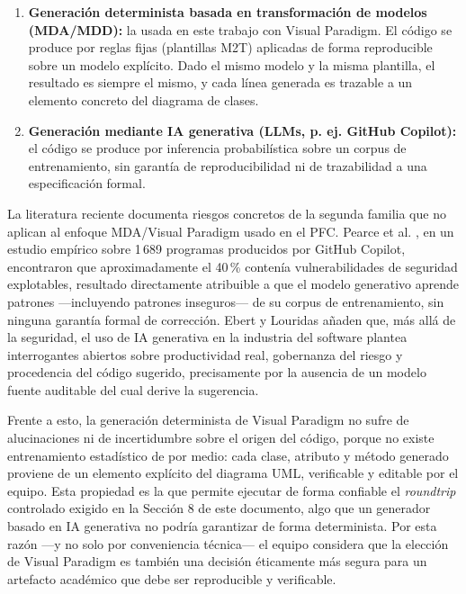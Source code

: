 \documentclass[11pt,a4paper]{article}
\begin{document}
\begin{enumerate}
  \item \textbf{Generación determinista basada en transformación de modelos (MDA/MDD):} la usada en este trabajo con Visual Paradigm. El código se produce por reglas fijas (plantillas M2T) aplicadas de forma reproducible sobre un modelo explícito. Dado el mismo modelo y la misma plantilla, el resultado es siempre el mismo, y cada línea generada es trazable a un elemento concreto del diagrama de clases.
  \item \textbf{Generación mediante IA generativa (LLMs, p. ej. GitHub Copilot):} el código se produce por inferencia probabilística sobre un corpus de entrenamiento, sin garantía de reproducibilidad ni de trazabilidad a una especificación formal.
\end{enumerate}
 
La literatura reciente documenta riesgos concretos de la segunda familia que no aplican al enfoque MDA/Visual Paradigm usado en el PFC. Pearce et al. \cite{pearce2022}, en un estudio empírico sobre 1\,689 programas producidos por GitHub Copilot, encontraron que aproximadamente el 40\,\% contenía vulnerabilidades de seguridad explotables, resultado directamente atribuible a que el modelo generativo aprende patrones —incluyendo patrones inseguros— de su corpus de entrenamiento, sin ninguna garantía formal de corrección. Ebert y Louridas \cite{ebert2023} añaden que, más allá de la seguridad, el uso de IA generativa en la industria del software plantea interrogantes abiertos sobre productividad real, gobernanza del riesgo y procedencia del código sugerido, precisamente por la ausencia de un modelo fuente auditable del cual derive la sugerencia.
 
Frente a esto, la generación determinista de Visual Paradigm no sufre de alucinaciones ni de incertidumbre sobre el origen del código, porque no existe entrenamiento estadístico de por medio: cada clase, atributo y método generado proviene de un elemento explícito del diagrama UML, verificable y editable por el equipo. Esta propiedad es la que permite ejecutar de forma confiable el \textit{roundtrip} controlado exigido en la Sección 8 de este documento, algo que un generador basado en IA generativa no podría garantizar de forma determinista. Por esta razón —y no solo por conveniencia técnica— el equipo considera que la elección de Visual Paradigm es también una decisión éticamente más segura para un artefacto académico que debe ser reproducible y verificable.
\end{document}

